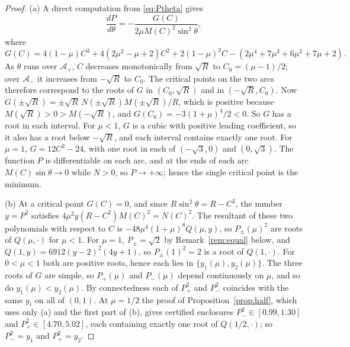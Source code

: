 \documentclass[11pt]{article}
\theoremstyle{definition}
\newcommand{\Ap}{\mathcal{A}_+}
\newcommand{\Am}{\mathcal{A}_-}
\begin{document}
\begin{proof}
(a) A direct computation from \eqref{eq:Ptheta} gives
\[
  \frac{dP}{d\theta} = -\frac{G(C)}{2\mu M(C)^2 \sin^2\theta},
\]
where
\begin{equation}\label{eq:K}
  G(C) = 4(1 - \mu) C^3 + 4(2\mu^2 - \mu + 2) C^2 + 2(1 - \mu)^3 C - (2\mu^4 + 7\mu^3 + 6\mu^2 + 7\mu + 2).
\end{equation}
As $\theta$ runs over $\Ap$, $C$ decreases monotonically from $\sqrt{R}$ to $C_0 = (\mu - 1)/2$; over $\Am$ it increases from $-\sqrt{R}$ to $C_0$. The critical points on the two arcs therefore correspond to the roots of $G$ in $(C_0, \sqrt{R})$ and in $(-\sqrt{R}, C_0)$. Now $G(\pm\sqrt{R}) = \pm\sqrt{R}\, N(\pm\sqrt{R}) M(\pm\sqrt{R})/R$, which is positive because $M(\sqrt{R}) > 0 > M(-\sqrt{R})$, and $G(C_0) = -3(1 + \mu)^4/2 < 0$. So $G$ has a root in each interval. For $\mu < 1$, $G$ is a cubic with positive leading coefficient, so it also has a root below $-\sqrt{R}$, and each interval contains exactly one root. For $\mu = 1$, $G = 12C^2 - 24$, with one root in each of $(-\sqrt{3}, 0)$ and $(0, \sqrt{3})$. The function $P$ is differentiable on each arc, and at the ends of each arc $M(C)\sin\theta \to 0$ while $N > 0$, so $P \to +\infty$; hence the single critical point is the minimum.

(b) At a critical point $G(C) = 0$, and since $R\sin^2\theta = R - C^2$, the number $y = P^2$ satisfies $4\mu^2 y (R - C^2) M(C)^2 = N(C)^2$. The resultant of these two polynomials with respect to $C$ is $-48\mu^4 (1 + \mu)^8 Q(\mu, y)$, so $P_\pm(\mu)^2$ are roots of $Q(\mu, \cdot)$ for $\mu < 1$. For $\mu = 1$, $P_\pm = \sqrt{2}$ by Remark~\ref{rem:equal} below, and $Q(1, y) = 6912 (y - 2)^2 (4y + 1)$, so $P_\pm(1)^2 = 2$ is a root of $Q(1, \cdot)$. For $0 < \mu < 1$ both are positive roots, hence each lies in $\{y_1(\mu), y_2(\mu)\}$. The three roots of $G$ are simple, so $P_+(\mu)$ and $P_-(\mu)$ depend continuously on $\mu$, and so do $y_1(\mu) < y_2(\mu)$. By connectedness each of $P_+^2$ and $P_-^2$ coincides with the same $y_i$ on all of $(0, 1)$. At $\mu = 1/2$ the proof of Proposition~\ref{prop:half}, which uses only (a) and the first part of (b), gives certified enclosures $P_-^2 \in [0.99, 1.30]$ and $P_+^2 \in [4.70, 5.02]$, each containing exactly one root of $Q(1/2, \cdot)$; so $P_-^2 = y_1$ and $P_+^2 = y_2$.


\end{proof}
\end{document}
